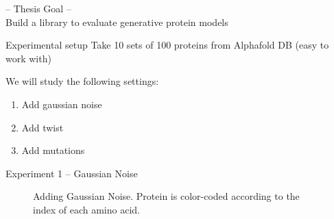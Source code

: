 \documentclass[aspectratio=169, 10pt, dvipsnames]{beamer}
\begin{document}
\begin{frame}[standout]
  -- Thesis Goal -- \\
  Build a library to evaluate generative protein models
\end{frame}

\begin{frame}[fragile]{Experimental setup}
  Take 10 sets of 100 proteins from Alphafold DB (easy to work with)

  \pause We will study the following settings:
  \begin{enumerate}
    \pause\item Add gaussian noise
    \pause\item Add twist
    \pause\item Add mutations
  \end{enumerate}

\end{frame}

{
\begin{frame}[fragile]{Experiment 1 -- Gaussian Noise}
  \begin{figure}
    \centering
  \end{figure}
  \begin{figure}
    \centering

    \caption{Adding Gaussian Noise. Protein is color-coded according to the
      index of each amino acid.}
    \label{fig:twist}
  \end{figure}
\end{frame}
}
\end{document}
